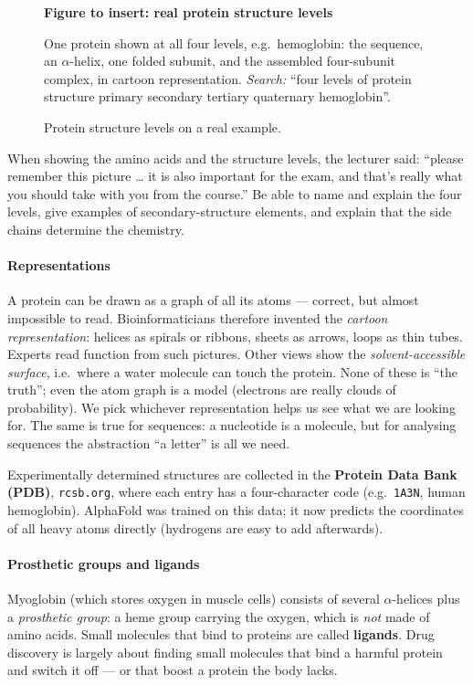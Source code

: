 \documentclass[11pt, oneside]{book}
\newcommand{\seq}[1]{\texttt{#1}}
\newcommand{\figureplaceholder}[5]{%
\begin{figure}[htbp]
\centering
\begin{tcolorbox}[unbreakable,width=\linewidth,height=#1,colback=accent!3,
  colframe=accent!30,boxrule=0.5pt,arc=2.5mm,sharp corners=all,
  valign=center,halign=center,fontupper=\small]
{\bfseries\color{accent}Figure to insert: #2}\par\medskip
{\color{gray!75!black}#3}
\end{tcolorbox}
\caption{#4}\label{#5}
\end{figure}}
\begin{document}
\figureplaceholder{4.2cm}{real protein structure levels}%
{One protein shown at all four levels, e.g.\ hemoglobin: the sequence, an
$\alpha$-helix, one folded subunit, and the assembled four-subunit complex,
in cartoon representation. \textit{Search:} ``four levels of protein
structure primary secondary tertiary quaternary hemoglobin''.}%
{Protein structure levels on a real example.}{fig:structure-real}

\begin{notebox}[title={Exam hint from the lecture}]
When showing the amino acids and the structure levels, the lecturer said:
``please remember this picture \ldots{} it is also important for the exam,
and that's really what you should take with you from the course.'' Be able to
name and explain the four levels, give examples of secondary-structure
elements, and explain that the side chains determine the chemistry.
\end{notebox}

\paragraph{Representations}
A protein can be drawn as a graph of all its atoms --- correct, but almost
impossible to read. Bioinformaticians therefore invented the \emph{cartoon
representation}: helices as spirals or ribbons, sheets as arrows, loops as
thin tubes. Experts read function from such pictures. Other views show the
\emph{solvent-accessible surface}, i.e.\ where a water molecule can touch
the protein. None of these is ``the truth''; even the atom graph is a model
(electrons are really clouds of probability). We pick whichever
representation helps us see what we are looking for. The same is true for
sequences: a nucleotide is a molecule, but for analysing sequences the
abstraction ``a letter'' is all we need.

Experimentally determined structures are collected in the \textbf{Protein Data
Bank (PDB)}, \texttt{rcsb.org}, where each entry has a four-character code
(e.g.\ \seq{1A3N}, human hemoglobin). AlphaFold was trained on this data; it
now predicts the coordinates of all heavy atoms directly (hydrogens are easy
to add afterwards).

\paragraph{Prosthetic groups and ligands}
Myoglobin (which stores oxygen in muscle cells) consists of several
$\alpha$-helices plus a \emph{prosthetic group}: a heme group carrying the
oxygen, which is \emph{not} made of amino acids. Small molecules that bind
to proteins are called \textbf{ligands}. Drug discovery is largely about
finding small molecules that bind a harmful protein and switch it off --- or
that boost a protein the body lacks.
\end{document}
